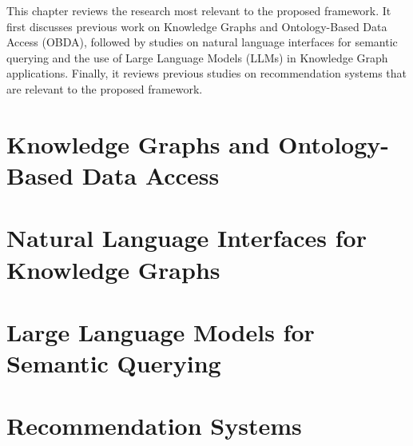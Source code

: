 This chapter reviews the research most relevant to the proposed framework. It first discusses previous work on Knowledge Graphs and Ontology-Based Data Access (OBDA), followed by studies on natural language interfaces for semantic querying and the use of Large Language Models (LLMs) in Knowledge Graph applications. Finally, it reviews previous studies on recommendation systems that are relevant to the proposed framework.
\section{Knowledge Graphs and Ontology-Based Data Access}

\section{Natural Language Interfaces for Knowledge Graphs}

\section{Large Language Models for Semantic Querying}

\section{Recommendation Systems}